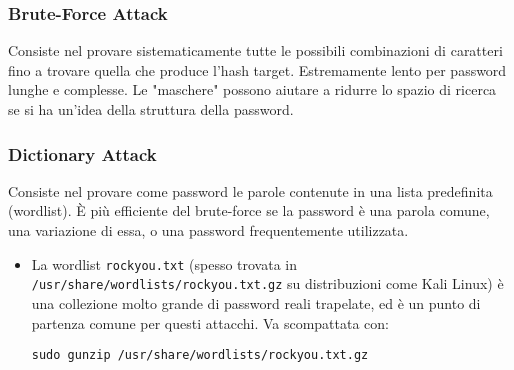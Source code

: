 \subsubsection{Brute-Force Attack}
Consiste nel provare sistematicamente tutte le possibili combinazioni di caratteri fino a trovare quella che produce l'hash target. Estremamente lento per password lunghe e complesse. Le "maschere" possono aiutare a ridurre lo spazio di ricerca se si ha un'idea della struttura della password.

\subsubsection{Dictionary Attack}
Consiste nel provare come password le parole contenute in una lista predefinita (wordlist). È più efficiente del brute-force se la password è una parola comune, una variazione di essa, o una password frequentemente utilizzata.
\begin{itemize}
    \item La wordlist \texttt{rockyou.txt} (spesso trovata in \texttt{/usr/share/wordlists/rockyou.txt.gz} su distribuzioni come Kali Linux) è una collezione molto grande di password reali trapelate, ed è un punto di partenza comune per questi attacchi. Va scompattata con:
\begin{verbatim}
sudo gunzip /usr/share/wordlists/rockyou.txt.gz
\end{verbatim}
\end{itemize}

